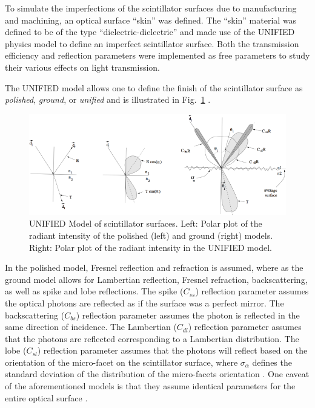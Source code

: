 To simulate the imperfections of the scintillator surfaces due to manufacturing and machining, an optical surface ``skin'' was defined.  The ``skin'' material was defined to be of the type ``dielectric-dielectric'' and made use of the UNIFIED physics model \cite{scint_surface_sim} to define an imperfect scintillator surface.  Both the transmission efficiency and reflection parameters were implemented as free parameters to study their various effects on light transmission.

The UNIFIED model allows one to define the finish of the scintillator surface as \textit{polished}, \textit{ground}, or \textit{unified} and is illustrated in Fig.~\ref{fig:polished_vs_ground} \cite{scint_surface_sim}.
	\begin{figure}[!htb]
	\centering
	\includegraphics[width=1.0\columnwidth]{simulation/figs/polished_vs_ground}
	\caption{UNIFIED Model of scintillator surfaces.  Left: Polar plot of the radiant intensity of the polished (left) and ground (right) models.  Right: Polar plot of the radiant intensity in the UNIFIED model.}
	\label{fig:polished_vs_ground}
	\end{figure}
In the polished model, Fresnel reflection and refraction is assumed, where as the ground model allows for Lambertian reflection, Fresnel refraction, backscattering, as well as spike and lobe reflections.  The spike ($C_{ss}$) reflection parameter assumes the optical photons are reflected as if the surface was a perfect mirror.  The backscattering ($C_{bs}$) reflection parameter assumes the photon is reflected in the same direction of incidence.  The Lambertian ($C_{dl}$) reflection parameter assumes that the photons are reflected corresponding to a Lambertian distribution.  The lobe ($C_{sl}$) reflection parameter assumes that the photons will reflect based on the orientation of the micro-facet on the scintillator surface, where $\sigma_{\alpha}$ defines the standard deviation of the distribution of the micro-facets orientation \cite{scint_surface_sim}.  One caveat of the aforementioned models is that they assume identical parameters for the entire optical surface \cite{puneet_sim_wiki}.

